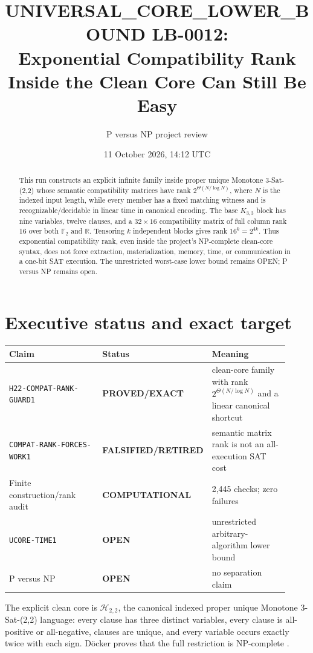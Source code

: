 \documentclass[11pt]{article}
\title{UNIVERSAL\_CORE\_LOWER\_BOUND LB-0012:\\
Exponential Compatibility Rank Inside the Clean Core Can Still Be Easy}
\author{P versus NP project review}
\date{11 October 2026, 14:12 UTC}
\newcommand{\Htwo}{\mathcal H_{2,2}}
\newcommand{\EXACT}{\textbf{PROVED/EXACT}}
\newcommand{\OPEN}{\textbf{OPEN}}
\newcommand{\RETIRED}{\textbf{FALSIFIED/RETIRED}}
\newcommand{\COMP}{\textbf{COMPUTATIONAL}}
\begin{document}
\maketitle

\begin{abstract}
This run constructs an explicit infinite family inside proper unique
Monotone 3-Sat-(2,2) whose semantic compatibility matrices have rank
$2^{\Theta(N/\log N)}$, where $N$ is the indexed input length, while every
member has a fixed matching witness and is recognizable/decidable in linear
time in canonical encoding.  The base $K_{3,3}$ block has nine variables,
twelve clauses, and a $32\times16$ compatibility matrix of full column rank
16 over both $\mathbb F_2$ and $\mathbb R$.  Tensoring $k$ independent blocks
gives rank $16^k=2^{4k}$.  Thus exponential compatibility rank, even inside
the project's NP-complete clean-core syntax, does not force extraction,
materialization, memory, time, or communication in a one-bit SAT execution.
The unrestricted worst-case lower bound remains OPEN; P versus NP remains
open.
\end{abstract}

\section{Executive status and exact target}

\begin{center}
\begin{tabular}{@{}p{0.38\linewidth}p{0.20\linewidth}p{0.34\linewidth}@{}}
\toprule
Claim & Status & Meaning\\
\midrule
\texttt{H22-COMPAT-RANK-GUARD1} & \EXACT & clean-core family with
rank $2^{\Theta(N/\log N)}$ and a linear canonical shortcut\\
\texttt{COMPAT-RANK-FORCES-WORK1} & \RETIRED & semantic matrix rank is not
an all-execution SAT cost\\
Finite construction/rank audit & \COMP & 2,445 checks; zero failures\\
\texttt{UCORE-TIME1} & \OPEN & unrestricted arbitrary-algorithm lower bound\\
P versus NP & \OPEN & no separation claim\\
\bottomrule
\end{tabular}
\end{center}

The explicit clean core is
\(
\Htwo
\), the canonical indexed proper unique Monotone 3-Sat-(2,2) language:
every clause has three distinct variables, every clause is all-positive or
all-negative, clauses are unique, and every variable occurs exactly twice
with each sign.  D\"ocker proves that the full restriction is NP-complete
\cite{doecker}.
\end{document}
